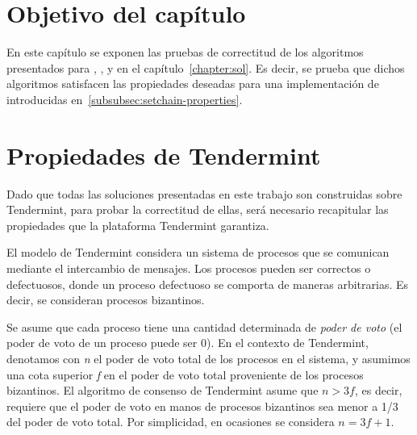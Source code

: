 \section{Objetivo del capítulo}
En este capítulo se exponen las pruebas de correctitud de los algoritmos presentados para
\vanilla, \compresschain, y \hashchain en el capítulo~\ref{chapter:sol}.
Es decir, se prueba que dichos algoritmos satisfacen las propiedades deseadas para una
implementación de \setchain introducidas en~\ref{subsubsec:setchain-properties}.

\section{Propiedades de Tendermint}\label{sec:properties}
Dado que todas las soluciones presentadas en este trabajo son construidas sobre Tendermint,
para probar la correctitud de ellas, será necesario recapitular las propiedades que la
plataforma Tendermint garantiza.

El modelo de Tendermint considera un sistema de procesos que se comunican mediante el intercambio de
mensajes.
Los procesos pueden ser correctos o defectuosos, donde un proceso defectuoso se comporta de maneras
arbitrarias. Es decir, se consideran procesos bizantinos.

Se asume que cada proceso tiene una cantidad determinada de \textit{poder de voto} (el poder de
voto de un proceso puede ser 0).
%
En el contexto de Tendermint, denotamos con \textit{n} el poder de voto total de los procesos
en el sistema, y asumimos una cota superior \textit{f} en el poder de voto total proveniente de
los procesos bizantinos.
%
El algoritmo de consenso de Tendermint asume que $n > 3f$, es decir, requiere que el poder de voto
en manos de procesos bizantinos sea menor a 1/3 del poder de voto total.
Por simplicidad, en ocasiones se considera $n = 3f + 1$.

